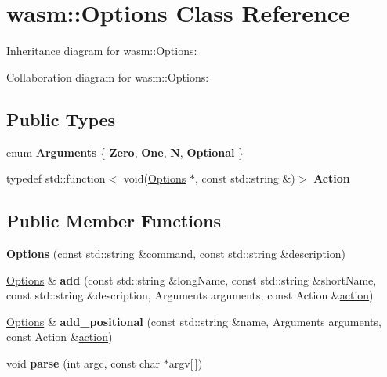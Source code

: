 \hypertarget{classwasm_1_1_options}{}\section{wasm\+:\+:Options Class Reference}
\label{classwasm_1_1_options}


Inheritance diagram for wasm\+:\+:Options\+:


Collaboration diagram for wasm\+:\+:Options\+:
\subsection*{Public Types}
\begin{DoxyCompactItemize}
\item 
\mbox{\label{classwasm_1_1_options_a2ac5a5c30fc597e35fae22f90e2816fb}} 
enum {\bfseries Arguments} \{ {\bfseries Zero}, 
{\bfseries One}, 
{\bfseries N}, 
{\bfseries Optional}
 \}
\item 
\mbox{\label{classwasm_1_1_options_aeafb68d098ed7bade9b3a746b7ddf7c5}} 
typedef std\+::function$<$ void(\mbox{\hyperlink{classwasm_1_1_options}{Options}} $\ast$, const std\+::string \&)$>$ {\bfseries Action}
\end{DoxyCompactItemize}
\subsection*{Public Member Functions}
\begin{DoxyCompactItemize}
\item 
\mbox{\label{classwasm_1_1_options_a9a424bfbb829082b61f0fb3aec86feaa}} 
{\bfseries Options} (const std\+::string \&command, const std\+::string \&description)
\item 
\mbox{\label{classwasm_1_1_options_ac24096c4ce9e6dcaed2c58899184cd5a}} 
\mbox{\hyperlink{classwasm_1_1_options}{Options}} \& {\bfseries add} (const std\+::string \&long\+Name, const std\+::string \&short\+Name, const std\+::string \&description, Arguments arguments, const Action \&\mbox{\hyperlink{structaction}{action}})
\item 
\mbox{\label{classwasm_1_1_options_a64a5f855b64e4343b860842700e80572}} 
\mbox{\hyperlink{classwasm_1_1_options}{Options}} \& {\bfseries add\+\_\+positional} (const std\+::string \&name, Arguments arguments, const Action \&\mbox{\hyperlink{structaction}{action}})
\item 
\mbox{\label{classwasm_1_1_options_a1a08ff7cb4d49bbfc35b70e4f83daa28}} 
void {\bfseries parse} (int argc, const char $\ast$argv\mbox{[}$\,$\mbox{]})
\end{DoxyCompactItemize}
